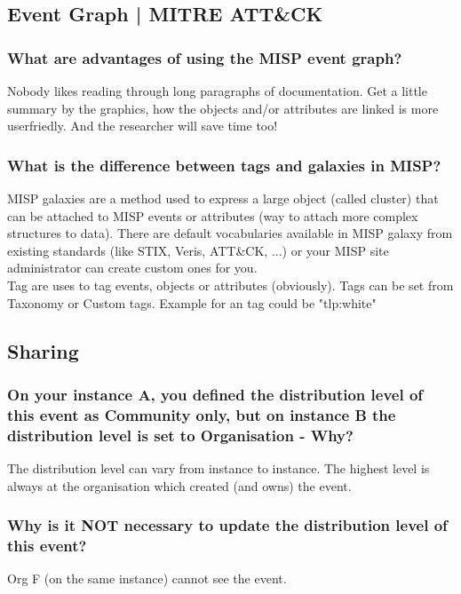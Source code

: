 \subsection{Event Graph | MITRE ATT\&CK}

\subsubsection{What are advantages of using the MISP event graph?}
Nobody likes reading through long paragraphs of documentation. Get a little summary by the graphics, how the objects and/or attributes are linked is more userfriedly. And the researcher will save time too!

\subsubsection{What is the difference between tags and galaxies in MISP?}
MISP galaxies are a method used to express a large object (called cluster) that can be attached to MISP events or attributes (way to attach more complex structures to data). There are default vocabularies available in MISP galaxy from existing standards (like STIX, Veris, ATT\&CK, ...) or your MISP site administrator can create custom ones for you.\\

Tag are uses to tag events, objects or attributes (obviously). Tags can be set from Taxonomy or Custom tags. Example for an tag could be "tlp:white"

\subsection{Sharing}

\subsubsection{On your instance A, you defined the distribution level of this event as Community only, but on instance B the distribution level is set to Organisation - Why?}
The distribution level can vary from instance to instance. The highest level is always at the organisation which created (and owns) the event.

\subsubsection{Why is it NOT necessary to update the distribution level of this event?}
Org F (on the same instance) cannot see the event.

